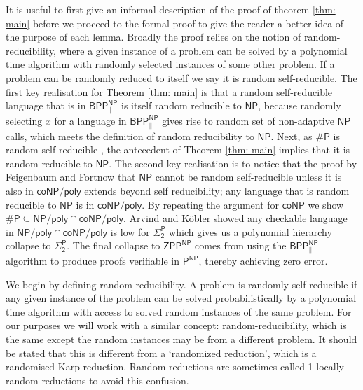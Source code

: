 \documentclass[10pt,a4paper]{article}
\begin{document}
It is useful to first give an informal description of the proof of theorem \ref{thm: main} before we proceed to the formal proof to give the reader a better idea of the purpose of each lemma. Broadly the proof relies on the notion of random-reducibility, where a given instance of a problem can be solved by a polynomial time algorithm with randomly selected instances of some other problem. If a problem can be randomly reduced to itself we say it is random self-reducible. 
The first key realisation for Theorem \ref{thm: main} is that a random self-reducible language that is in $\mathsf{BPP^{NP}_{\parallel}}$ is itself random reducible to $\mathsf{NP}$, because randomly selecting $x$ for a language in $\mathsf{BPP^{NP}_{\parallel}}$ gives rise to random set of non-adaptive $\mathsf{NP}$ calls, which meets the definition of random reducibility to $\mathsf{NP}$.
Next, as $\mathsf{\#P}$ is random self-reducible \cite{feigenbaum1990random}, the antecedent of Theorem \ref{thm: main} implies that it is random reducible to $\mathsf{NP}$.
The second key realisation is to notice that the proof by Feigenbaum and Fortnow that $\mathsf{NP}$ cannot be random self-reducible unless it is also in $\mathsf{coNP/poly}$ extends beyond self reducibility; any language that is random reducible to $\mathsf{NP}$ is in $\mathsf{coNP/poly}$. 
By repeating the argument for $\mathsf{coNP}$ we show $\mathsf{\#P\subseteq NP/poly \cap coNP/poly}$. Arvind and Köbler \cite{ARVIND2002257} showed any checkable language in $\mathsf{NP/poly \cap coNP/poly}$  is low for $\mathsf{\Sigma^P_2}$ which gives us a polynomial hierarchy collapse to $\mathsf{\Sigma_2^P}$. The final collapse to $\mathsf{ZPP^{NP}}$ comes from using the $\mathsf{BPP^{NP}_{\parallel}}$ algorithm to produce proofs verifiable in $\mathsf{P^{NP}}$, thereby achieving zero error.

We begin by defining random reducibility. A problem is randomly self-reducible if any given instance of the problem can be solved probabilistically by a polynomial time algorithm with access to solved random instances of the same problem.  
For our purposes we will work with a similar concept: random-reducibility, which is the same except the random instances may be from a different problem. It should be stated that this is different from a `randomized reduction', which is a randomised Karp reduction. Random reductions are sometimes called 1-locally random reductions to avoid this confusion.
\end{document}
